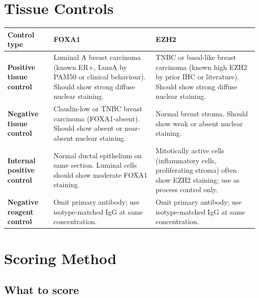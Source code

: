 \documentclass[11pt, a4paper]{article}
\begin{document}
\section{Tissue Controls}

\begin{center}
\begin{tabular}{p{3cm}p{4.5cm}p{4.5cm}}
\toprule
\textbf{Control type} & \textbf{FOXA1} &
\textbf{EZH2} \\
\midrule
\textbf{Positive tissue control} &
Luminal A breast carcinoma
(known ER$+$, LumA by PAM50 or
clinical behaviour).
Should show strong diffuse
nuclear staining. &
TNBC or basal-like breast carcinoma
(known high EZH2 by prior IHC
or literature).
Should show strong diffuse
nuclear staining. \\[0.4em]
\textbf{Negative tissue control} &
Claudin-low or TNBC breast
carcinoma (FOXA1-absent).
Should show absent or
near-absent nuclear staining. &
Normal breast stroma.
Should show weak or absent
nuclear staining. \\[0.4em]
\textbf{Internal positive control} &
Normal ductal epithelium
on same section.
Luminal cells should show
moderate FOXA1 staining. &
Mitotically active cells
(inflammatory cells, proliferating
stroma) often show EZH2 staining;
use as process control only. \\[0.4em]
\textbf{Negative reagent control} &
Omit primary antibody; use
isotype-matched IgG at same
concentration. &
Omit primary antibody; use
isotype-matched IgG at same
concentration. \\
\bottomrule
\end{tabular}
\end{center}

\section{Scoring Method}
\label{sec:scoring}

\subsection{What to score}
\end{document}
